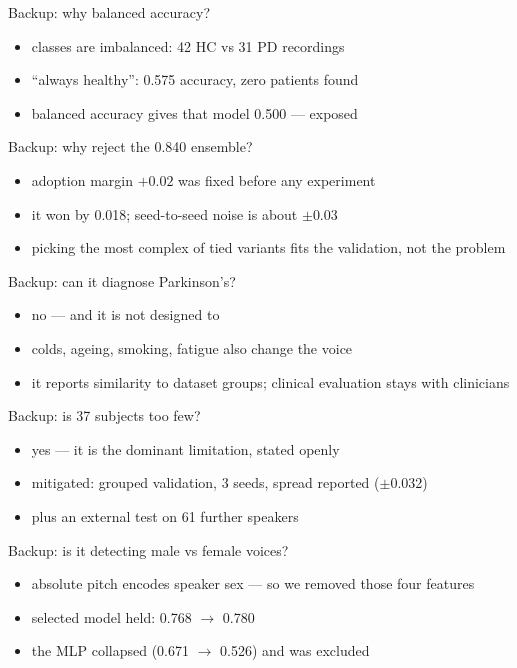 \documentclass[aspectratio=169,11pt]{beamer}
\begin{document}
\begin{frame}{Backup: why balanced accuracy?}
\begin{itemize}
  \item classes are imbalanced: 42 HC vs 31 PD recordings
  \item ``always healthy'': 0.575 accuracy, zero patients found
  \item balanced accuracy gives that model 0.500 --- exposed
\end{itemize}
\end{frame}

\begin{frame}{Backup: why reject the 0.840 ensemble?}
\begin{itemize}
  \item adoption margin $+0.02$ was fixed before any experiment
  \item it won by 0.018; seed-to-seed noise is about $\pm$0.03
  \item picking the most complex of tied variants fits the validation,
        not the problem
\end{itemize}
\end{frame}

\begin{frame}{Backup: can it diagnose Parkinson's?}
\begin{itemize}
  \item no --- and it is not designed to
  \item colds, ageing, smoking, fatigue also change the voice
  \item it reports similarity to dataset groups; clinical evaluation
        stays with clinicians
\end{itemize}
\end{frame}

\begin{frame}{Backup: is 37 subjects too few?}
\begin{itemize}
  \item yes --- it is the dominant limitation, stated openly
  \item mitigated: grouped validation, 3 seeds, spread reported
        ($\pm$0.032)
  \item plus an external test on 61 further speakers
\end{itemize}
\end{frame}

\begin{frame}{Backup: is it detecting male vs female voices?}
\begin{itemize}
  \item absolute pitch encodes speaker sex --- so we removed those four
        features
  \item selected model held: 0.768 $\to$ 0.780
  \item the MLP collapsed (0.671 $\to$ 0.526) and was excluded
\end{itemize}
\end{frame}
\end{document}
